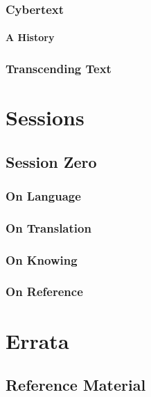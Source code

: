 \documentclass[10pt,twoside,twocolumn,openany,nomultitoc]{book}
\begin{document}
\section{Cybertext}\vspace{2pt}
\subsection{A History}
    \lipsum[2]
\section{Transcending Text}
    \lipsum[6]

\part{Sessions}

\chapter{Session Zero}\vspace{6pt}

\begin{DndReadAloud}
  \lipsum[1]
\end{DndReadAloud}


\section{On Language}

\section{On Translation}
    \lipsum[1]
\section{On Knowing}
    \lipsum[2]
\section{On Reference}
    \lipsum[3]
    
\part{Errata}
\chapter{Reference Material}
\end{document}
